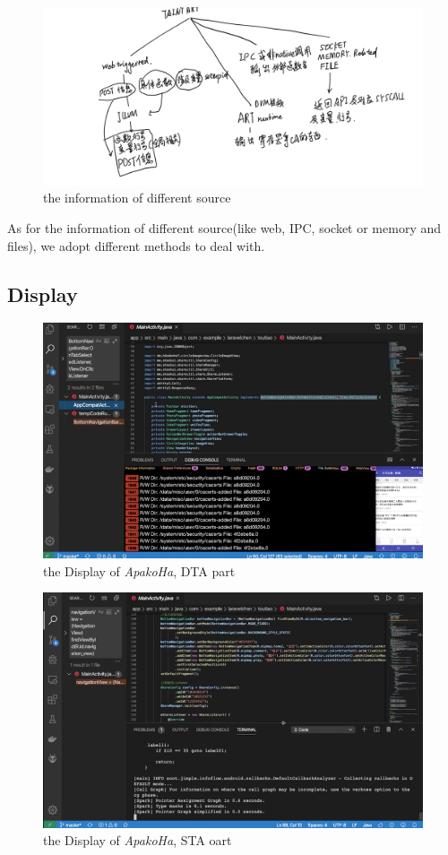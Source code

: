 \documentclass{article}
\begin{document}
\begin{figure}[ht]
  \centering
  \includegraphics[scale=0.2]{2.png}
  \caption{the information of different source}
  \label{fig:2}
\end{figure}
As for the information of different source(like web, IPC, socket or memory and files), we adopt different methods to deal with.

\subsection{Display}

\begin{figure}[ht]
  \centering
  \includegraphics[scale=0.4]{Display1.png}
  \caption{the Display of \emph{ApakoHa}, DTA part}
  \label{fig:ApakoHa}
\end{figure}
\begin{figure}[ht]
  \centering
  \includegraphics[scale=0.4]{Display2.png}
  \caption{the Display of \emph{ApakoHa}, STA oart}
  \label{fig:ApakoHa}
\end{figure}
\end{document}
